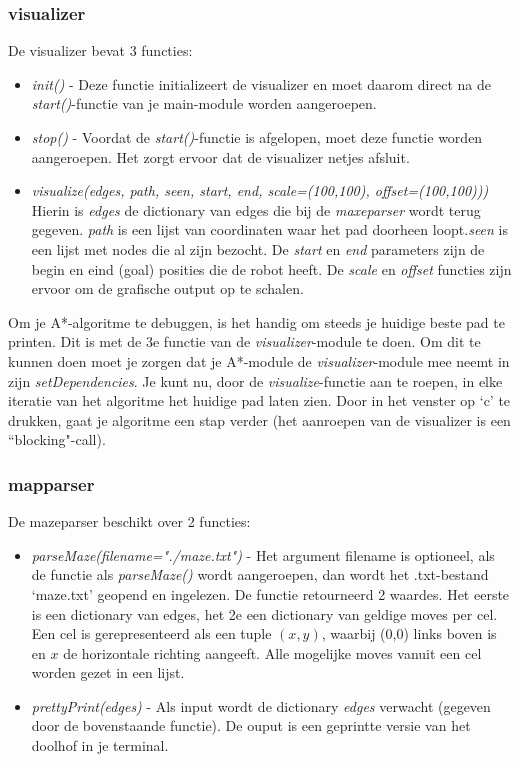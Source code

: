 \documentclass[a4paper, twoside]{article}
\begin{document}
\subsubsection{visualizer}
De visualizer bevat 3 functies: \\
\begin{itemize}
\item \textit{init()} - Deze functie initializeert de visualizer en moet daarom direct na de \textit{start()}-functie van je main-module worden aangeroepen.
\item \textit{stop()} - Voordat de \textit{start()}-functie is afgelopen, moet deze functie worden aangeroepen. Het zorgt ervoor dat de visualizer netjes afsluit.
\item \textit{visualize(edges, path, seen, start, end, scale=(100,100), offset=(100,100)))}\\ Hierin is \textit{edges} de dictionary van edges die bij de \textit{maxeparser} wordt terug gegeven. \textit{path} is een lijst van coordinaten waar het pad doorheen loopt.\textit{seen} is een lijst met nodes die al zijn bezocht. De \textit{start} en \textit{end} parameters zijn de begin en eind (goal) posities die de robot heeft. De \textit{scale} en \textit{offset} functies zijn ervoor om de grafische output op te schalen.
\end{itemize}

Om je A*-algoritme te debuggen, is het handig om steeds je huidige beste pad te printen. Dit is met de 3e functie van de \textit{visualizer}-module te doen. Om dit te kunnen doen moet je zorgen dat je A*-module de \textit{visualizer}-module mee neemt in zijn \textit{setDependencies}. Je kunt nu, door de \textit{visualize}-functie aan te roepen, in elke iteratie van het algoritme het huidige pad laten zien. Door in het venster  op `c' te drukken, gaat je algoritme een stap verder (het aanroepen van de visualizer is een ``blocking"-call).

\subsubsection{mapparser}
De mazeparser beschikt over 2 functies:
\begin{itemize}
\item \textit{parseMaze(filename="./maze.txt")} - Het argument filename is optioneel, als de functie als \textit{parseMaze()} wordt aangeroepen, dan wordt het .txt-bestand `maze.txt' geopend en ingelezen. De functie retourneerd 2 waardes. Het eerste is een dictionary van edges, het 2e een dictionary van geldige moves per cel. Een cel is gerepresenteerd als een tuple $(x,y)$, waarbij (0,0) links boven is en $x$ de horizontale richting aangeeft. Alle mogelijke moves vanuit een cel worden gezet in een lijst.
\item \textit{prettyPrint(edges)} - Als input wordt de dictionary \textit{edges} verwacht (gegeven door de bovenstaande functie). De ouput is een geprintte versie van het doolhof in je terminal.
\end{itemize}
\end{document}
